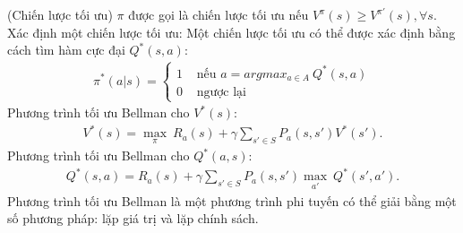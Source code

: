 \begin{dn}\rm 
(Chiến lược tối ưu) $\pi$ được gọi là chiến lược tối ưu nếu $V^{\pi}(s) \geq V^{\pi '}(s), \forall s.$\\
Xác định một chiến lược tối ưu: Một chiến lược tối ưu có thể được xác định bằng cách tìm hàm cực đại $Q^{*}(s,a)$:
\begin{align}
\pi^{*}(a|s)=\begin{cases}
1 & \text{ nếu } a=argmax_{a\in A}~Q^{*}(s,a) \\ 
0 & \text{ ngược lại } 
\end{cases}
\end{align}
Phương trình tối ưu Bellman cho $V^{*}(s)$:
\begin{align}
V^{*}(s)= \displaystyle\max_{\pi}~ R_{a}(s)+\gamma \sum_{s'\in S}P_{a}(s,s')V^{*}(s').
\end{align}
Phương trình tối ưu Bellman cho $Q^{*}(a,s)$:
\begin{align}
Q^{*}(s,a)=R_{a}(s)+\gamma \sum_{s'\in S}P_{a}(s,s') \displaystyle\max_{a'}~Q^{*}(s',a').
\end{align}
Phương trình tối ưu Bellman là một phương trình phi tuyến có thể giải bằng một số phương pháp: lặp giá trị và lặp chính sách.
\end{dn}